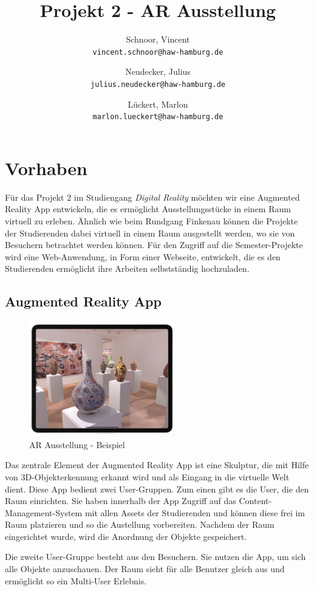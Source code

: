 \documentclass[pdftex,10pt,a4paper,oneside]{article}
\author{
  Schnoor, Vincent\\
  \texttt{vincent.schnoor@haw-hamburg.de}
  \and
  Neudecker, Julius\\
  \texttt{julius.neudecker@haw-hamburg.de}
  \and
  Lückert, Marlon\\
  \texttt{marlon.lueckert@haw-hamburg.de}
}
\title{Projekt 2 - AR Ausstellung}
\numberwithin{equation}{section} %
\begin{document}
\maketitle

\section{Vorhaben}

Für das Projekt 2 im Studiengang \textit{Digital Reality} möchten wir eine Augmented Reality App entwickeln, die es ermöglicht Ausstellungsstücke in einem Raum virtuell zu erleben. Ähnlich wie beim Rundgang Finkenau können die Projekte der Studierenden dabei virtuell in einem Raum ausgestellt werden, wo sie von Besuchern betrachtet werden können.
Für den Zugriff auf die Semester-Projekte wird eine Web-Anwendung, in Form einer Webseite, entwickelt, die es den Studierenden ermöglicht ihre Arbeiten selbstständig hochzuladen.
\subsection{Augmented Reality App}

\begin{figure}[H]
    \centering
    \includegraphics[width=6.36cm, height=5cm]{images/3d-gallery.jpg}
    \caption{AR Ausstellung - Beispiel}
    \label{fig:my_label}
\end{figure}

Das zentrale Element der Augmented Reality App ist eine Skulptur, die mit Hilfe von 3D-Objekterkennung erkannt wird und als Eingang in die virtuelle Welt dient.
Diese App bedient zwei User-Gruppen. Zum einen gibt es die User, die den Raum einrichten. Sie haben innerhalb der App Zugriff auf das Content-Management-System mit allen Assets der Studierenden und können diese frei im Raum platzieren und so die Austellung vorbereiten. Nachdem der Raum eingerichtet wurde, wird die Anordnung der Objekte gespeichert.

Die zweite User-Gruppe besteht aus den Besuchern. Sie nutzen die App, um sich alle Objekte anzuschauen. Der Raum sieht für alle Benutzer gleich aus und ermöglicht so ein Multi-User Erlebnis.
\end{document}
